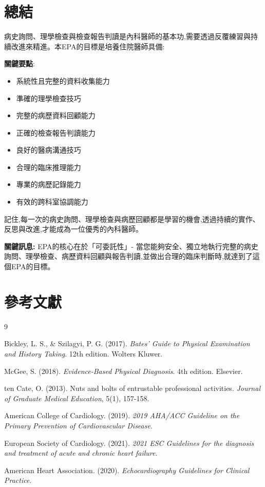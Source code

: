 \documentclass[12pt,a4paper]{article}
\begin{document}
\section{總結}

病史詢問、理學檢查與檢查報告判讀是內科醫師的基本功,需要透過反覆練習與持續改進來精進。本EPA的目標是培養住院醫師具備:

\begin{importantbox}
\textbf{關鍵要點}:
\begin{itemize}[nosep]
    \item 系統性且完整的資料收集能力
    \item 準確的理學檢查技巧
    \item 完整的病歷資料回顧能力
    \item 正確的檢查報告判讀能力
    \item 良好的醫病溝通技巧
    \item 合理的臨床推理能力
    \item 專業的病歷記錄能力
    \item 有效的跨科室協調能力
\end{itemize}
\end{importantbox}

記住,每一次的病史詢問、理學檢查與病歷回顧都是學習的機會,透過持續的實作、反思與改進,才能成為一位優秀的內科醫師。

\begin{importantbox}
\textbf{關鍵訊息:} EPA的核心在於「可委託性」- 當您能夠安全、獨立地執行完整的病史詢問、理學檢查、病歷資料回顧與報告判讀,並做出合理的臨床判斷時,就達到了這個EPA的目標。
\end{importantbox}

\section{參考文獻}
\begin{thebibliography}{9}

Bickley, L. S., \& Szilagyi, P. G. (2017). \textit{Bates' Guide to Physical Examination and History Taking}. 12th edition. Wolters Kluwer.

McGee, S. (2018). \textit{Evidence-Based Physical Diagnosis}. 4th edition. Elsevier.

ten Cate, O. (2013). Nuts and bolts of entrustable professional activities. \textit{Journal of Graduate Medical Education}, 5(1), 157-158.

American College of Cardiology. (2019). \textit{2019 AHA/ACC Guideline on the Primary Prevention of Cardiovascular Disease}.

European Society of Cardiology. (2021). \textit{2021 ESC Guidelines for the diagnosis and treatment of acute and chronic heart failure}.

American Heart Association. (2020). \textit{Echocardiography Guidelines for Clinical Practice}.

\end{thebibliography}
\end{document}
